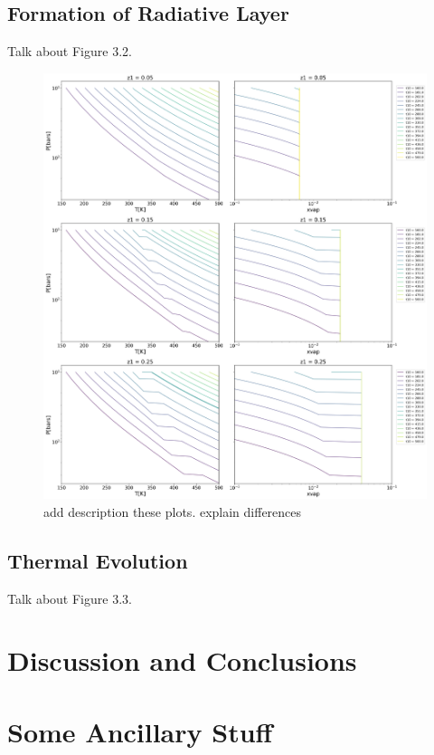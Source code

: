\documentclass[11pt]{ucscthesisbs}
\begin{document}
\section{Formation of Radiative Layer}
Talk about Figure 3.2.
\begin{figure}[ht!]
 \centerline{
  \includegraphics[width=7.0in]{figures/static_radiative_layer_plots_without_grid_points.png}
 }
\caption[Inhibition of convection on Neptune]
{add description these plots. explain differences}
\label{fig:radiative}
\end{figure}


\section{Thermal Evolution}
Talk about Figure 3.3.



\chapter{Discussion and Conclusions}





\appendix
\chapter{Some Ancillary Stuff}



\end{document}
